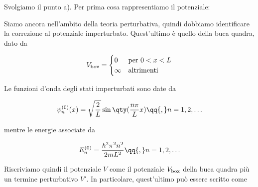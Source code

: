 \begin{soluzione}
   Svolgiamo il punto a). Per prima cosa rappresentiamo il potenziale:

   \begin{figure}[H]
      \centering
   \end{figure}

   Siamo ancora nell'ambito della teoria perturbativa, quindi dobbiamo identificare la correzione al potenziale imperturbato. Quest'ultimo è quello della buca quadra, dato da
   
   \begin{equation*}
      V_{\rm box}=
      \begin{cases}
         0 & \text{per } 0<x<L\\
         \infty & \text{altrimenti}\\
      \end{cases}
   \end{equation*}

   Le funzioni d'onda degli stati imperturbati sono date da
   
   \begin{equation*}
      \psi_n^{(0)}(x)
      =\sqrt{\frac{2}{L}} \sin{\qty( \frac{n \pi}{L} x)}
      \qq{,}
      n=1,2,\ldots
   \end{equation*}

   mentre le energie associate da

   \begin{equation*}
      E_n^{(0)}
      =\frac{\hbar^2 \pi^2 n^2}{2mL^2}
      \qq{,}
      n=1,2,\ldots
   \end{equation*}

   Riscriviamo quindi il potenziale $V$ come il potenziale $V_{\rm box}$ della buca quadra più un termine perturbativo $V'$. In particolare, quest'ultimo può essere scritto come
   

\end{soluzione}
